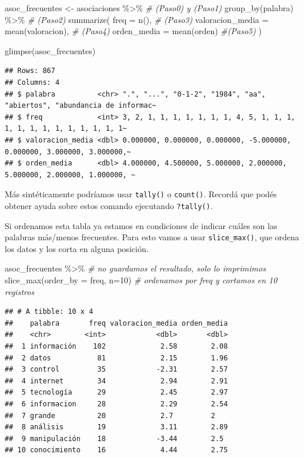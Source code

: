 \documentclass[
]{book}
\newenvironment{Shaded}{\begin{snugshade}}{\end{snugshade}}
\newcommand{\AttributeTok}[1]{\textcolor[rgb]{0.77,0.63,0.00}{#1}}
\newcommand{\CommentTok}[1]{\textcolor[rgb]{0.56,0.35,0.01}{\textit{#1}}}
\newcommand{\DecValTok}[1]{\textcolor[rgb]{0.00,0.00,0.81}{#1}}
\newcommand{\FunctionTok}[1]{\textcolor[rgb]{0.00,0.00,0.00}{#1}}
\newcommand{\NormalTok}[1]{#1}
\newcommand{\OtherTok}[1]{\textcolor[rgb]{0.56,0.35,0.01}{#1}}
\newcommand{\SpecialCharTok}[1]{\textcolor[rgb]{0.00,0.00,0.00}{#1}}
\begin{document}
\begin{Shaded}
\begin{Highlighting}[]
\NormalTok{asoc\_frecuentes }\OtherTok{\textless{}{-}}\NormalTok{ asociaciones }\SpecialCharTok{\%\textgreater{}\%} \CommentTok{\# (Paso0) y (Paso1)}
  \FunctionTok{group\_by}\NormalTok{(palabra) }\SpecialCharTok{\%\textgreater{}\%} \CommentTok{\# (Paso2)}
  \FunctionTok{summarize}\NormalTok{( }
    \AttributeTok{freq =} \FunctionTok{n}\NormalTok{(), }\CommentTok{\# (Paso3)}
    \AttributeTok{valoracion\_media =} \FunctionTok{mean}\NormalTok{(valoracion), }\CommentTok{\# (Paso4)}
    \AttributeTok{orden\_media =} \FunctionTok{mean}\NormalTok{(orden) }\CommentTok{\#(Paso5)}
\NormalTok{  )}

\FunctionTok{glimpse}\NormalTok{(asoc\_frecuentes) }
\end{Highlighting}
\end{Shaded}

\begin{verbatim}
## Rows: 867
## Columns: 4
## $ palabra          <chr> ".", "...", "0-1-2", "1984", "aa", "abiertos", "abundancia de informac~
## $ freq             <int> 3, 2, 1, 1, 1, 1, 1, 1, 1, 4, 5, 1, 1, 1, 1, 1, 1, 1, 1, 1, 1, 1, 1, 1~
## $ valoracion_media <dbl> 0.000000, 0.000000, 0.000000, -5.000000, 0.000000, 3.000000, 3.000000,~
## $ orden_media      <dbl> 4.000000, 4.500000, 5.000000, 2.000000, 5.000000, 2.000000, 1.000000, ~
\end{verbatim}

Más sintéticamente podríamos usar \texttt{tally()} o \texttt{count()}. Recordá que podés obtener ayuda sobre estos comando ejecutando \texttt{?tally()}.

Si ordenamos esta tabla ya estamos en condiciones de indicar cuáles son las palabras más/menos frecuentes.
Para esto vamos a usar \texttt{slice\_max()}, que ordena los datos y los corta en alguna posición.

\begin{Shaded}
\begin{Highlighting}[]
\NormalTok{asoc\_frecuentes }\SpecialCharTok{\%\textgreater{}\%}  \CommentTok{\# no guardamos el resultado, solo lo imprimimos}
  \FunctionTok{slice\_max}\NormalTok{(}\AttributeTok{order\_by =}\NormalTok{ freq, }\AttributeTok{n=}\DecValTok{10}\NormalTok{) }\CommentTok{\# ordenamos por freq y cortamos en 10 registros}
\end{Highlighting}
\end{Shaded}

\begin{verbatim}
## # A tibble: 10 x 4
##    palabra       freq valoracion_media orden_media
##    <chr>        <int>            <dbl>       <dbl>
##  1 información    102             2.58        2.08
##  2 datos           81             2.15        1.96
##  3 control         35            -2.31        2.57
##  4 internet        34             2.94        2.91
##  5 tecnología      29             2.45        2.97
##  6 informacion     28             2.29        2.54
##  7 grande          20             2.7         2   
##  8 análisis        19             3.11        2.89
##  9 manipulación    18            -3.44        2.5 
## 10 conocimiento    16             4.44        2.75
\end{verbatim}
\end{document}
